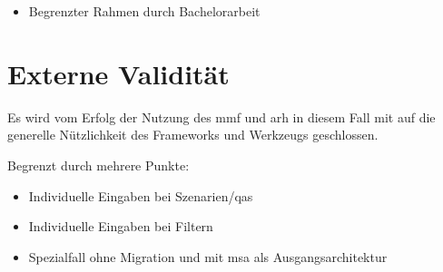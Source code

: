\begin{itemize}
	\item Begrenzter Rahmen durch Bachelorarbeit
\end{itemize}

\section{Externe Validität}

Es wird vom Erfolg der Nutzung des \gls{mmf} und \gls{arh} in diesem Fall mit \jf auf die generelle Nützlichkeit des Frameworks und Werkzeugs geschlossen.

Begrenzt durch mehrere Punkte:

\begin{itemize}
	\item Individuelle Eingaben bei Szenarien/\glspl{qa}
	\item Individuelle Eingaben bei Filtern
	\item Spezialfall ohne Migration und mit \gls{msa} als Ausgangsarchitektur
\end{itemize}